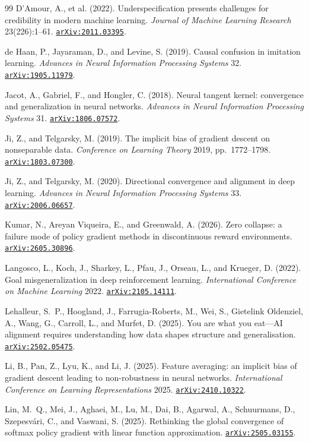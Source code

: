 \documentclass[11pt]{amsart}
\newcommand{\arxiv}[1]{\href{https://arxiv.org/abs/#1}{\texttt{arXiv:#1}}}
\theoremstyle{plain}
\theoremstyle{definition}
\begin{document}
\begin{thebibliography}{99}
 D'Amour, A., et al. (2022). Underspecification presents challenges for credibility in modern machine learning. \emph{Journal of Machine Learning Research} 23(226):1--61. \arxiv{2011.03395}.

 de Haan, P., Jayaraman, D., and Levine, S. (2019). Causal confusion in imitation learning. \emph{Advances in Neural Information Processing Systems} 32. \arxiv{1905.11979}.

 Jacot, A., Gabriel, F., and Hongler, C. (2018). Neural tangent kernel: convergence and generalization in neural networks. \emph{Advances in Neural Information Processing Systems} 31. \arxiv{1806.07572}.

 Ji, Z., and Telgarsky, M. (2019). The implicit bias of gradient descent on nonseparable data. \emph{Conference on Learning Theory} 2019, pp.~1772--1798. \arxiv{1803.07300}.

 Ji, Z., and Telgarsky, M. (2020). Directional convergence and alignment in deep learning. \emph{Advances in Neural Information Processing Systems} 33. \arxiv{2006.06657}.

 Kumar, N., Areyan Viqueira, E., and Greenwald, A. (2026). Zero collapse: a failure mode of policy gradient methods in discontinuous reward environments. \arxiv{2605.30896}.

 Langosco, L., Koch, J., Sharkey, L., Pfau, J., Orseau, L., and Krueger, D. (2022). Goal misgeneralization in deep reinforcement learning. \emph{International Conference on Machine Learning} 2022. \arxiv{2105.14111}.

 Lehalleur, S.~P., Hoogland, J., Farrugia-Roberts, M., Wei, S., Gietelink Oldenziel, A., Wang, G., Carroll, L., and Murfet, D. (2025). You are what you eat---AI alignment requires understanding how data shapes structure and generalisation. \arxiv{2502.05475}.

 Li, B., Pan, Z., Lyu, K., and Li, J. (2025). Feature averaging: an implicit bias of gradient descent leading to non-robustness in neural networks. \emph{International Conference on Learning Representations} 2025. \arxiv{2410.10322}.

 Lin, M.~Q., Mei, J., Aghaei, M., Lu, M., Dai, B., Agarwal, A., Schuurmans, D., Szepesv\'ari, C., and Vaswani, S. (2025). Rethinking the global convergence of softmax policy gradient with linear function approximation. \arxiv{2505.03155}.


\end{thebibliography}
\end{document}
